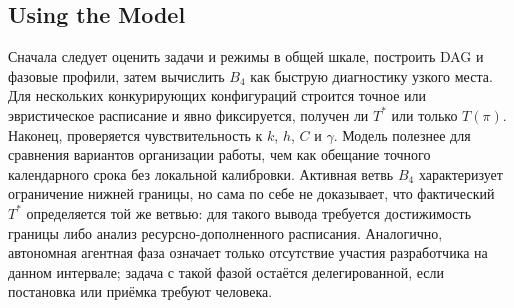 \subsection{Using the Model}

Сначала следует оценить задачи и режимы в общей шкале, построить DAG и фазовые
профили, затем вычислить $B_4$ как быструю диагностику узкого места. Для
нескольких конкурирующих конфигураций строится точное или эвристическое
расписание и явно фиксируется, получен ли $T^*$ или только $T(\pi)$. Наконец,
проверяется чувствительность к $k$, $h$, $C$ и $\gamma$. Модель полезнее для
сравнения вариантов организации работы, чем как обещание точного календарного
срока без локальной калибровки. Активная ветвь $B_4$ характеризует ограничение
нижней границы, но сама по себе не доказывает, что фактический $T^*$ определяется
той же ветвью: для такого вывода требуется достижимость границы либо анализ
ресурсно-дополненного расписания. Аналогично, автономная агентная фаза означает
только отсутствие участия разработчика на данном интервале; задача с такой
фазой остаётся делегированной, если постановка или приёмка требуют человека.

